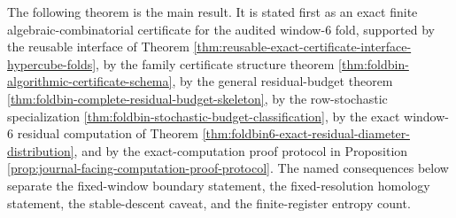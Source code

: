 \documentclass[12pt,a4paper]{article}
\theoremstyle{plain}
\theoremstyle{definition}
\numberwithin{equation}{section}
\begin{document}
The following theorem is the main result.  It is stated first as an exact finite algebraic-combinatorial certificate for the audited window-\(6\) fold, supported by the reusable interface of Theorem \ref{thm:reusable-exact-certificate-interface-hypercube-folds}, by the family certificate structure theorem \ref{thm:foldbin-algorithmic-certificate-schema}, by the general residual-budget theorem \ref{thm:foldbin-complete-residual-budget-skeleton}, by the row-stochastic specialization \ref{thm:foldbin-stochastic-budget-classification}, by the exact window-\(6\) residual computation of Theorem \ref{thm:foldbin6-exact-residual-diameter-distribution}, and by the exact-computation proof protocol in Proposition \ref{prop:journal-facing-computation-proof-protocol}.  The named consequences below separate the fixed-window boundary statement, the fixed-resolution homology statement, the stable-descent caveat, and the finite-register entropy count.
\end{document}
